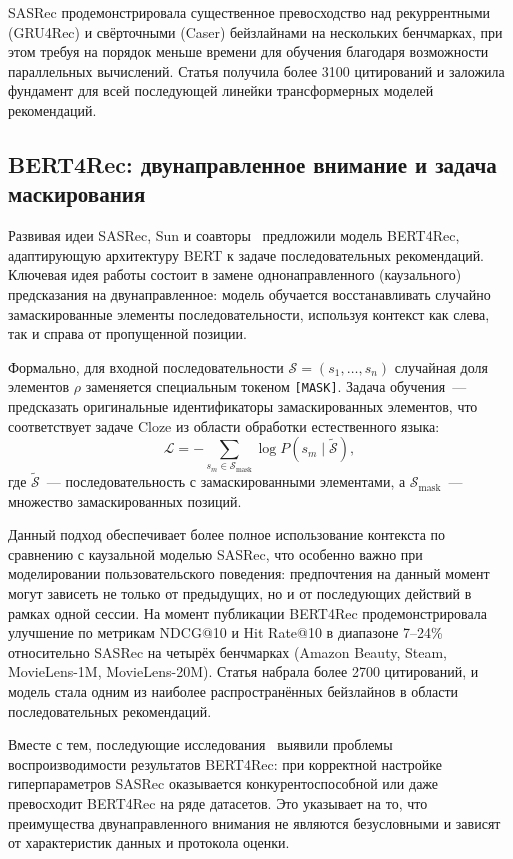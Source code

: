 SASRec продемонстрировала существенное превосходство над рекуррентными (GRU4Rec) и свёрточными (Caser) бейзлайнами на нескольких бенчмарках, при этом требуя на порядок меньше времени для обучения благодаря возможности параллельных вычислений. Статья получила более 3100 цитирований и заложила фундамент для всей последующей линейки трансформерных моделей рекомендаций.

\subsection{BERT4Rec: двунаправленное внимание и задача маскирования}

Развивая идеи SASRec, Sun и соавторы~\cite{bert4rec2019} предложили модель BERT4Rec, адаптирующую архитектуру BERT к задаче последовательных рекомендаций. Ключевая идея работы состоит в замене однонаправленного (каузального) предсказания на двунаправленное: модель обучается восстанавливать случайно замаскированные элементы последовательности, используя контекст как слева, так и справа от пропущенной позиции.

Формально, для входной последовательности $\mathcal{S} = (s_1, \ldots, s_n)$ случайная доля элементов $\rho$ заменяется специальным токеном \texttt{[MASK]}. Задача обучения~--- предсказать оригинальные идентификаторы замаскированных элементов, что соответствует задаче Cloze из области обработки естественного языка:
\begin{equation}
    \mathcal{L} = -\sum_{s_m \in \mathcal{S}_{\text{mask}}} \log P(s_m \mid \tilde{\mathcal{S}}),
\end{equation}
где $\tilde{\mathcal{S}}$~--- последовательность с замаскированными элементами, а $\mathcal{S}_{\text{mask}}$~--- множество замаскированных позиций.

Данный подход обеспечивает более полное использование контекста по сравнению с каузальной моделью SASRec, что особенно важно при моделировании пользовательского поведения: предпочтения на данный момент могут зависеть не только от предыдущих, но и от последующих действий в рамках одной сессии. На момент публикации BERT4Rec продемонстрировала улучшение по метрикам NDCG@10 и Hit Rate@10 в диапазоне 7--24\% относительно SASRec на четырёх бенчмарках (Amazon Beauty, Steam, MovieLens-1M, MovieLens-20M). Статья набрала более 2700 цитирований, и модель стала одним из наиболее распространённых бейзлайнов в области последовательных рекомендаций.

Вместе с тем, последующие исследования~\cite{petrov2022bert4rec_replicability} выявили проблемы воспроизводимости результатов BERT4Rec: при корректной настройке гиперпараметров SASRec оказывается конкурентоспособной или даже превосходит BERT4Rec на ряде датасетов. Это указывает на то, что преимущества двунаправленного внимания не являются безусловными и зависят от характеристик данных и протокола оценки.

